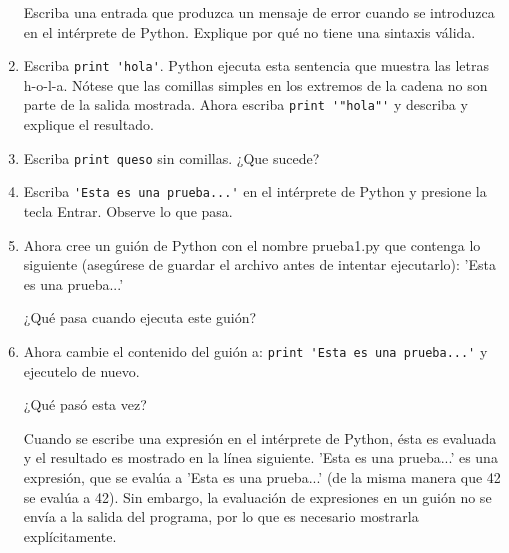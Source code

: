 \begin{enumerate}
Escriba una entrada que produzca un mensaje de error cuando se 
introduzca en el intérprete de Python. Explique por qué no tiene una sintaxis 
válida.


\item Escriba \verb+print 'hola'+. Python ejecuta esta sentencia que muestra las letras h-o-l-a. 
Nótese que las comillas simples en los extremos de la cadena no son parte de la salida mostrada. 
Ahora escriba  \verb+print '"hola"'+ y describa y explique el resultado.

\item Escriba \verb+print queso+ sin comillas. ¿Que sucede?


\item Escriba \verb+'Esta es una prueba...'+ en el intérprete de Python y presione la tecla Entrar. 
Observe lo que pasa. 

\item Ahora cree un guión de Python con el nombre prueba1.py que contenga lo siguiente 
(asegúrese de guardar el archivo antes de intentar ejecutarlo):
'Esta es una prueba...'

¿Qué pasa cuando ejecuta este guión? 

\item Ahora cambie el contenido del guión a: \verb+print 'Esta es una prueba...'+ y ejecutelo de nuevo.

¿Qué pasó esta vez?

Cuando se escribe una expresión en el intérprete de Python, ésta es evaluada y el 
resultado es mostrado en la línea siguiente. 'Esta es una prueba...' es una expresión, que se 
evalúa a 'Esta es una prueba...' (de la misma manera que 42 se evalúa a 42). Sin embargo, la 
evaluación de expresiones en un guión no se envía a la salida del programa, por lo que es necesario 
mostrarla explícitamente.
\end{enumerate}

